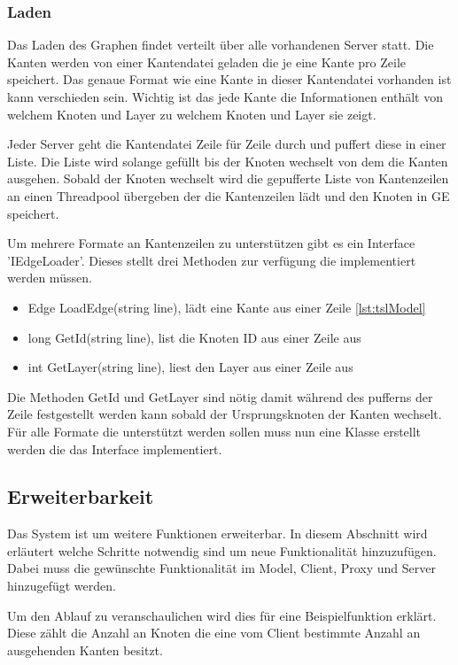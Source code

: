 \subsubsection{Laden}

Das Laden des Graphen findet verteilt über alle vorhandenen Server statt. Die Kanten werden von einer Kantendatei geladen die je eine Kante pro Zeile speichert. Das genaue Format wie eine Kante in dieser Kantendatei vorhanden ist kann verschieden sein. Wichtig ist das jede Kante die Informationen enthält von welchem Knoten und Layer zu welchem Knoten und Layer sie zeigt.

Jeder Server geht die Kantendatei Zeile für Zeile durch und puffert diese in einer Liste. Die Liste wird solange gefüllt bis der Knoten wechselt von dem die Kanten ausgehen. Sobald der Knoten wechselt wird die gepufferte Liste von Kantenzeilen an einen Threadpool übergeben der die Kantenzeilen lädt und den Knoten in GE speichert.

Um mehrere Formate an Kantenzeilen zu unterstützen gibt es ein Interface 'IEdgeLoader'. Dieses stellt drei Methoden zur verfügung die implementiert werden müssen.

\begin{itemize}
  \item Edge LoadEdge(string line), lädt eine Kante aus einer Zeile \ref{lst:tslModel}
  \item long GetId(string line), list die Knoten ID aus einer Zeile aus
  \item int GetLayer(string line), liest den Layer aus einer Zeile aus
\end{itemize}

Die Methoden GetId und GetLayer sind nötig damit während des pufferns der Zeile festgestellt werden kann sobald der Ursprungsknoten der Kanten wechselt.
Für alle Formate die unterstützt werden sollen muss nun eine Klasse erstellt werden die das Interface implementiert.



\subsection{Erweiterbarkeit}

Das System ist um weitere Funktionen erweiterbar. In diesem Abschnitt wird erläutert welche Schritte notwendig sind um neue Funktionalität hinzuzufügen.
Dabei muss die gewünschte Funktionalität im Model, Client, Proxy und Server hinzugefügt werden.

Um den Ablauf zu veranschaulichen wird dies für eine Beispielfunktion erklärt. Diese zählt die Anzahl an Knoten die eine vom Client bestimmte Anzahl an ausgehenden Kanten besitzt.

